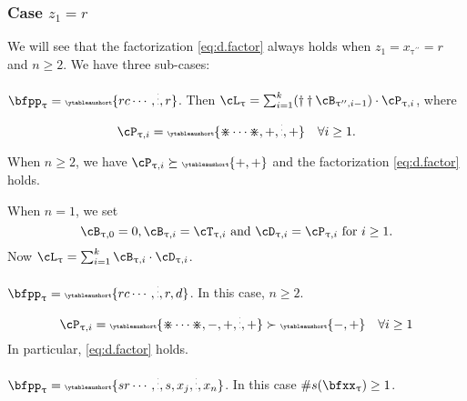 \documentclass[12pt,a4paper]{amsart}
\makeatletter
\numberwithin{equation}{section}
\theoremstyle{remark}
\def\bsign{{}^b\mathrm{Sign}}
\let\ytb=\ytableaushort
\newcommand{\tytb}[1]{{\tiny\ytb{#1}}}
\newcommand{\dotminus}{\mathbin{\text{\@dotminus}}}
\newcommand{\@dotminus}{%
  \ooalign{\hidewidth\raise1ex\hbox{.}\hidewidth\cr$\m@th-$\cr}%
}
\def\pcL{\cL^+}
\def\ncL{\cL^-}
\def\uptaupp{\uptau^{\prime\prime}}
\def\uum{{\dotminus}}
\def\uup{\divideontimes}
\makeatother
\begin{document}
 \subsubsection{Case $z_{1}=r$}\label{sec:z.r}
 We will see that the factorization \eqref{eq:d.factor} always holds
 when $z_{1}=x_{\uptaupp}=r$ and $n\geq 2$.
  We have three sub-cases:
  \begin{enumT}
  \item $\bfpp_{\uptau} = \tytb{rc\cdots,\vdots,r}$. Then
  $\cL_{\uptau}=\sum_{i=1}^{k} (\dagger\dagger \cB_{\uptaupp,i-1})\cdot \cP_{\uptau,i}$, where
  \begin{equation}\label{eq:rr.c}
  \cP_{\uptau,i}  = \tytb{\uup\cdots\uup,+,\vdots,+} \quad \forall i\geq 1.
  \end{equation}

 When $n\geq 2$, we have $\cP_{\uptau,i}\succeq \tytb{+,+}$ and the
 factorization \eqref{eq:d.factor} holds.

 When $n=1$, we set
 \begin{equation} \label{eq:gd.rr}
   \cB_{\uptau,0} = 0,
   \cB_{\uptau,i} = \cT_{\uptau,i} \text{ and
   } \cD_{\uptau,i} = \cP_{\uptau,i} \text{ for } i\geq 1.
 \end{equation}
 Now $\cL_{\uptau} = \sum_{i=1}^{k} \cB_{\uptau,i}\cdot \cD_{\uptau,i}$.

 \item $\bfpp_{\uptau} = \tytb{rc\cdots,\vdots,r,d}$.
 In this case, $n\geq 2$.
  \begin{equation}\label{eq:rd.c}
  \cP_{\uptau,i}  = \tytb{\uup\cdots\uup,-,+,\vdots,+} \succ \tytb{-,+} \quad  \forall i\geq 1
  \end{equation}
In particular, \eqref{eq:d.factor} holds.
 \item $\bfpp_{\uptau} = \tytb{sr\cdots,\vdots,s,{x_{j}},\vdots,{x_{n}}}$.
 In this case $\#s(\bfxx_{\uptau})\geq 1$.


\end{enumT}
\end{document}
